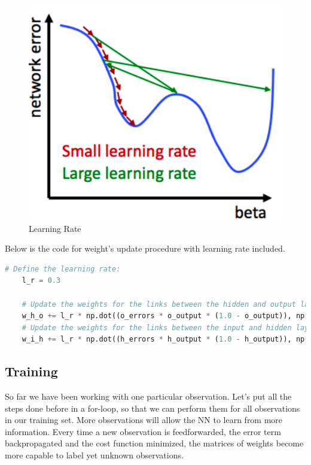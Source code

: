 \begin{figure}[H]
    \includegraphics[width=\linewidth]{pics/learning_rate.png}
    \caption{\label{fig:bp} Learning Rate}
\end{figure}

Below is the code for weight's update procedure with learning rate included.

\begin{lstlisting}[language=Python]
    # Define the learning rate:
    l_r = 0.3

    # Update the weights for the links between the hidden and output layers:
    w_h_o += l_r * np.dot((o_errors * o_output * (1.0 - o_output)), np.transpose(h_output))
    # Update the weights for the links between the input and hidden layers:
    w_i_h += l_r * np.dot((h_errors * h_output * (1.0 - h_output)), np.transpose(input))
\end{lstlisting}

\subsection{Training}

So far we have been working with one particular observation. Let's put all the steps done before in a for-loop, so that we can perform them for all observations in our training set. More observations will allow the NN to learn from more information. Every time a new observation is feedforwarded, the error term backpropagated and the cost function minimized, the matrices of weights become more capable to label yet unknown observations.

